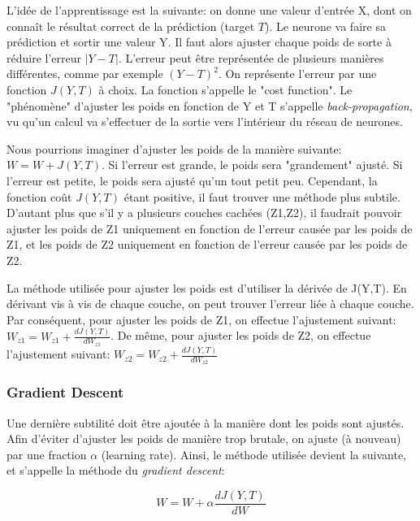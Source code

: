 \documentclass[11pt,a4paper]{report}
\begin{document}
    \par L'idée de l'apprentissage est la suivante: on donne une valeur d'entrée X, dont on connaît le résultat correct de la prédiction (target $T$). Le neurone va faire sa prédiction et sortir une valeur Y. Il faut alors ajuster chaque poids de sorte à réduire l'erreur $|Y-T|$. L'erreur peut être représentée de plusieurs manières différentes, comme par exemple $(Y - T)^2$. On représente l'erreur par une fonction $J(Y, T)$ à choix. La fonction s'appelle le "cost function". Le "phénomène" d'ajuster les poids en fonction de Y et T s'appelle \textit{back-propagation}, vu qu'un calcul va s'effectuer de la sortie vers l'intérieur du réseau de neurones. 

    \par Nous pourrions imaginer d'ajuster les poids de la manière suivante: $W = W + J(Y,T)$. Si l'erreur est grande, le poids sera "grandement" ajusté. Si l'erreur est petite, le poids sera ajusté qu'un tout petit peu. Cependant, la fonction coût $J(Y,T)$ étant positive, il faut trouver une méthode plus subtile. D'autant plus que s'il y a plusieurs couches cachées (Z1,Z2), il faudrait pouvoir ajuster les poids de Z1 uniquement en fonction de l'erreur causée par les poids de Z1, et les poids de Z2 uniquement en fonction de l'erreur causée par les poids de Z2. 

    \par La méthode utilisée pour ajuster les poids est d'utiliser la dérivée de J(Y,T). En dérivant vis à vis de chaque couche, on peut trouver l'erreur liée à chaque couche. Par conséquent, pour ajuster les poids de Z1, on effectue l'ajustement suivant: $W_{z1} = W_{z1} + \frac{dJ(Y,T)}{dW_{z1}}$. De même, pour ajuster les poids de Z2, on effectue l'ajustement suivant: $W_{z2} = W_{z2} + \frac{dJ(Y,T)}{dW_{z2}}$
  
  \subsubsection{Gradient Descent}
  
    \par Une dernière subtilité doit être ajoutée à la manière dont les poids sont ajustés. Afin d'éviter d'ajuster les poids de manière trop brutale, on ajuste (à nouveau) par une fraction $\alpha$ (learning rate). Ainsi, le méthode utilisée devient la suivante, et s'appelle la méthode du \textit{gradient descent}: 
    
    $$W = W + \alpha \frac{dJ(Y,T)}{dW}$$
    
\end{document}
